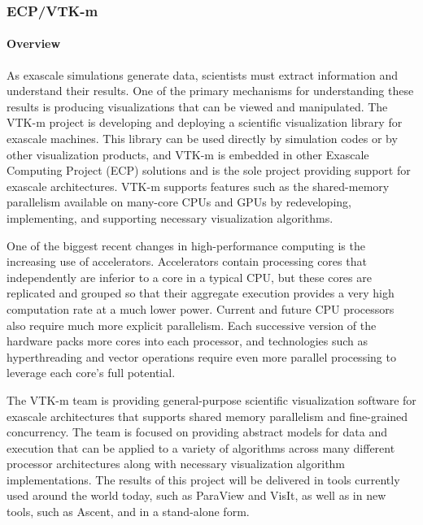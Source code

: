 \subsubsection{ ECP/VTK-m}

\paragraph{Overview}
As exascale simulations generate data, scientists must extract information and understand their results.
One of the primary mechanisms for understanding these results is producing visualizations that can be viewed and manipulated.
The VTK-m project is developing and deploying a scientific visualization library for exascale machines.
This library can be used directly by simulation codes or by other visualization products, and VTK-m is embedded in other Exascale Computing Project (ECP) solutions and is the sole project providing support for exascale architectures.
VTK-m supports features such as the shared-memory parallelism available on many-core CPUs and GPUs by redeveloping, implementing, and supporting necessary visualization algorithms.

One of the biggest recent changes in high-performance computing is the increasing use of accelerators.
Accelerators contain processing cores that independently are inferior to a core in a typical CPU, but these cores are replicated and grouped so that their aggregate execution provides a very high computation rate at a much lower power.
Current and future CPU processors also require much more explicit parallelism.
Each successive version of the hardware packs more cores into each processor, and technologies such as hyperthreading and vector operations require even more parallel processing to leverage each core’s full potential.

The VTK-m team is providing general-purpose scientific visualization software for exascale architectures that supports shared memory parallelism and fine-grained concurrency.
The team is focused on providing abstract models for data and execution that can be applied to a variety of algorithms across many different processor architectures along with necessary visualization algorithm implementations.
The results of this project will be delivered in tools currently used around the world today, such as ParaView and VisIt, as well as in new tools, such as Ascent, and in a stand-alone form.

